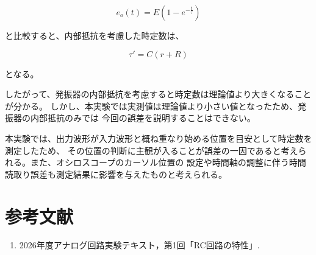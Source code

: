 \documentclass[11pt,a4paper]{jsarticle}
\begin{document}
\begin{equation}
e_o(t)
=
E\left(1-e^{-\frac{t}{\tau}}\right)
\end{equation}

と比較すると、内部抵抗を考慮した時定数は、

\begin{equation}
\tau'
=
C(r+R)
\end{equation}

となる。

したがって、発振器の内部抵抗を考慮すると時定数は理論値より大きくなることが分かる。
しかし、本実験では実測値は理論値より小さい値となったため、発振器の内部抵抗のみでは
今回の誤差を説明することはできない。

本実験では、出力波形が入力波形と概ね重なり始める位置を目安として時定数を測定したため、
その位置の判断に主観が入ることが誤差の一因であると考えられる。また、オシロスコープのカーソル位置の
設定や時間軸の調整に伴う時間読取り誤差も測定結果に影響を与えたものと考えられる。

\section{参考文献}

\begin{enumerate}
\renewcommand{\labelenumi}{[\arabic{enumi}]}

\item 2026年度アナログ回路実験テキスト，第1回「RC回路の特性」.

\end{enumerate}
\end{document}
